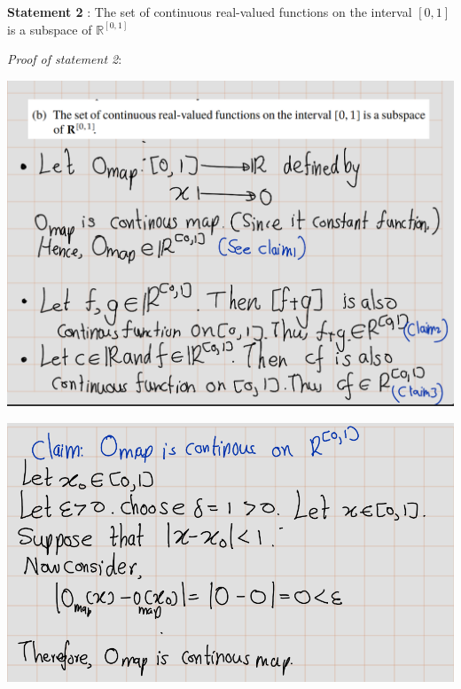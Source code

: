 \documentclass[
]{book}
\theoremstyle{definition}
\theoremstyle{definition}
\theoremstyle{definition}
\theoremstyle{definition}
\theoremstyle{remark}
\begin{document}
\textbf{Statement 2} : The set of continuous real-valued functions on the interval \([0, 1]\) is a subspace of \(\mathbb{R}^[0,1]\)

\emph{Proof of statement 2}:

\includegraphics{fig/Ex1C/Ex2-1.png}

\includegraphics{fig/Ex1C/Ex2-2.png}
\end{document}

